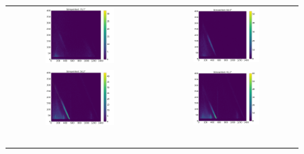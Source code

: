 \begin{figure}[ht]
	\centering
    \begin{tabular}{c c}
        \includegraphics[width=0.49\textwidth]{images/kali_szint_Streuwinkel_70.png} & \includegraphics[width=0.49\textwidth]{images/kali_szint_Streuwinkel_60.png} \\ \includegraphics[width=0.49\textwidth]{images/kali_szint_Streuwinkel_50.png} & \includegraphics[width=0.49\textwidth]{images/kali_szint_Streuwinkel_40.png} \\\

\end{tabular}
\end{figure}
